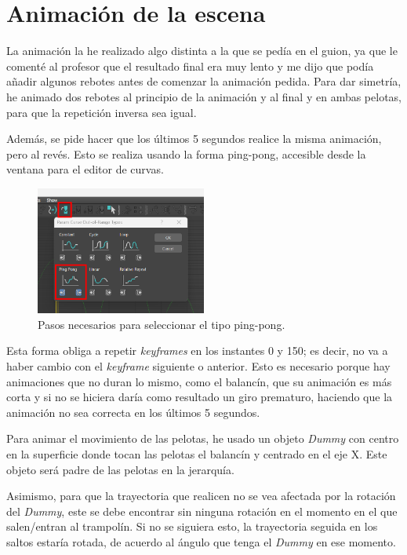 \documentclass{article}
\begin{document}
\section{Animación de la escena}

La animación la he realizado algo distinta a la que se pedía en el guion, ya que le comenté al profesor que el resultado final era muy lento y me dijo que podía añadir algunos rebotes antes de comenzar la animación pedida. Para dar simetría, he animado dos rebotes al principio de la animación y al final y en ambas pelotas, para que la repetición inversa sea igual. 

\bigskip

Además, se pide hacer que los últimos 5 segundos realice la misma animación, pero al revés. Esto se realiza usando la forma ping-pong, accesible desde la ventana para el editor de curvas.

\begin{figure}[H]
   \centering
   \includegraphics[width=0.5\textwidth]{imagenes/misc/ping-pong.png}
   \caption{Pasos necesarios para seleccionar el tipo ping-pong.}
\end{figure}

Esta forma obliga a repetir \textit{keyframes} en los instantes 0 y 150; es decir, no va a haber cambio con el \textit{keyframe} siguiente o anterior. Esto es necesario porque hay animaciones que no duran lo mismo, como el balancín, que su animación es más corta y si no se hiciera daría como resultado un giro prematuro, haciendo que la animación no sea correcta en los últimos 5 segundos.

\bigskip

Para animar el movimiento de las pelotas, he usado un objeto \textit{Dummy} con centro en la superficie donde tocan las pelotas el balancín y centrado en el eje X. Este objeto será padre de las pelotas en la jerarquía.

\bigskip

Asimismo, para que la trayectoria que realicen no se vea afectada por la rotación del \textit{Dummy}, este se debe encontrar sin ninguna rotación en el momento en el que salen/entran al trampolín. Si no se siguiera esto, la trayectoria seguida en los saltos estaría rotada, de acuerdo al ángulo que tenga el \textit{Dummy} en ese momento.
\end{document}

